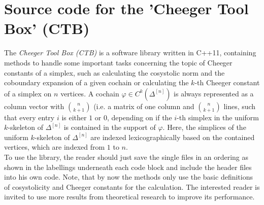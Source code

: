 \chapter{Source code for the 'Cheeger Tool Box' (CTB)}

\label{AppendixA}

The \textit{Cheeger Tool Box (CTB)} is a software library written in C++11, containing methods to handle some important tasks concerning the topic of Cheeger constants of a simplex, such as calculating the cosystolic norm and the coboundary expansion of a given cochain or calculating the \(k\)-th Cheeger constant of a simplex on \(n\) vertices. A cochain \(\varphi\in C^k(\Delta^{[n]})\) is always represented as a column vector with \(\binom{n}{k+1}\) (i.e. a matrix of one column and  \(\binom{n}{k+1}\) lines, such that every entry \(i\) is either \(1\) or \(0\), depending on if the \(i\)-th simplex in the uniform \(k\)-skeleton of \(\Delta^{[n]}\) is contained in the support of \(\varphi\). Here, the simplices of the uniform \(k\)-skeleton of \(\Delta^{[n]}\) are indexed lexicographically based on the contained vertices, which are indexed from \(1\) to \(n\).\\
To use the library, the reader should just save the single files in an ordering as shown in the labellings underneath each code block and include the header files into his own code. Note, that by now the methods only use the basic definitions of cosystolicity and Cheeger constants for the calculation. The interested reader is invited to use more results from theoretical research to improve its performance.\\







